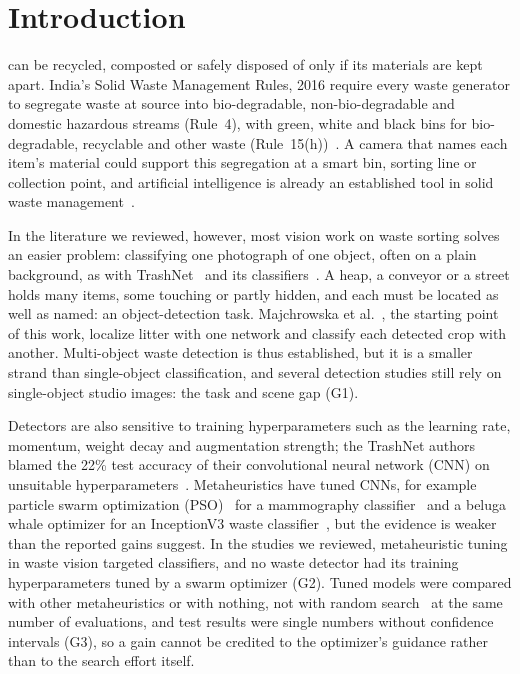 \section{Introduction}
\label{sec:intro}

 can be recycled, composted or safely disposed of only if its materials are kept apart. India's Solid Waste Management Rules, 2016 require every waste generator to segregate waste at source into bio-degradable, non-bio-degradable and domestic hazardous streams (Rule~4), with green, white and black bins for bio-degradable, recyclable and other waste (Rule~15(h))~\cite{moefcc2016solid}. A camera that names each item's material could support this segregation at a smart bin, sorting line or collection point, and artificial intelligence is already an established tool in solid waste management~\cite{abdallah2020artificial,fang2023artificial}.

In the literature we reviewed, however, most vision work on waste sorting solves an easier problem: classifying one photograph of one object, often on a plain background, as with TrashNet~\cite{yang2016classification} and its classifiers~\cite{kaya2023classification}. A heap, a conveyor or a street holds many items, some touching or partly hidden, and each must be located as well as named: an object-detection task. Majchrowska et al.~\cite{majchrowska2022deep}, the starting point of this work, localize litter with one network and classify each detected crop with another. Multi-object waste detection is thus established, but it is a smaller strand than single-object classification, and several detection studies still rely on single-object studio images: the task and scene gap (G1).

Detectors are also sensitive to training hyperparameters such as the learning rate, momentum, weight decay and augmentation strength; the TrashNet authors blamed the 22\% test accuracy of their convolutional neural network (CNN) on unsuitable hyperparameters~\cite{yang2016classification}. Metaheuristics have tuned CNNs, for example particle swarm optimization (PSO)~\cite{kennedy1995particle} for a mammography classifier~\cite{aguerchi2024cnn} and a beluga whale optimizer for an InceptionV3 waste classifier~\cite{sayed2024intelligent}, but the evidence is weaker than the reported gains suggest. In the studies we reviewed, metaheuristic tuning in waste vision targeted classifiers, and no waste detector had its training hyperparameters tuned by a swarm optimizer (G2). Tuned models were compared with other metaheuristics or with nothing, not with random search~\cite{bergstra2012random} at the same number of evaluations, and test results were single numbers without confidence intervals (G3), so a gain cannot be credited to the optimizer's guidance rather than to the search effort itself.

